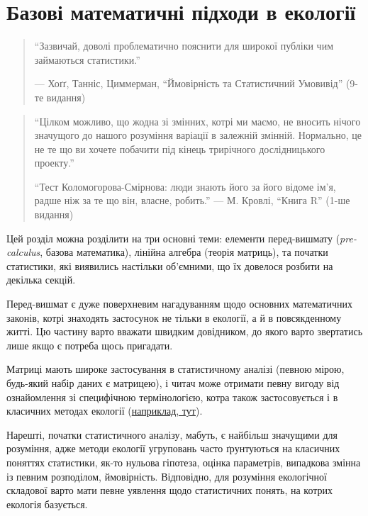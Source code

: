 \documentclass[
  11pt,
]{book}
\begin{document}
\chapter{Базові математичні підходи в екології}\label{numerical-ecology}

\begin{quote}
``Зазвичай, доволі проблематично пояснити для широкої публіки
чим займаються статистики.''

--- Хоґґ, Танніс, Циммерман, ``Ймовірність та Статистичний Умовивід'' (9-те видання)
\end{quote}

\begin{quote}
``Цілком можливо, що жодна зі змінних, котрі ми маємо,
не вносить нічого значущого до нашого розуміння
варіації в залежній змінній.
Нормально, це не те що ви хочете побачити
під кінець трирічного дослідницького проекту.''

``Тест Коломогорова-Смірнова: люди знають його за його відоме ім'я,
радше ніж за те що він, власне, робить.''
--- М. Кровлі, ``Книга R'' (1-ше видання)
\end{quote}

Цей розділ можна розділити на три основні теми: елементи перед-вишмату (\emph{pre-calculus}, базова математика), лінійна алгебра (теорія матриць), та початки статистики, які виявились настільки об'ємними, що їх довелося розбити на декілька секцій.

Перед-вишмат є дуже поверхневим нагадуванням щодо основних математичних законів, котрі знаходять застосунок не тільки в екології, а й в повсякденному житті. Цю частину варто вважати швидким довідником, до якого варто звертатись лише якщо є потреба щось пригадати.

Матриці мають широке застосування в статистичному аналізі (певною мірою, будь-який набір даних є матрицею), і читач може отримати певну вигоду від ознайомлення зі специфічною термінологією, котра також застосовується і в класичних методах екології (\hyperref[Leslie-matrix]{наприклад, тут}).

Нарешті, початки статистичного аналізу, мабуть, є найбільш значущими для розуміння, адже методи екології угруповань часто ґрунтуються на класичних поняттях статистики, як-то нульова гіпотеза, оцінка параметрів, випадкова змінна із певним розподілом, ймовірність. Відповідно, для розуміння екологічної складової варто мати певне уявлення щодо статистичних понять, на котрих екологія базується.
\end{document}
